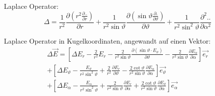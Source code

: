 \begin{description}
\[          \]
    \item Laplace Operator:
          \[
              \Delta=\frac{1}{r^{2}} \frac{\partial\left(r^{2} \frac{\partial . .}{\partial r}\right)}{\partial r}+\frac{1}{r^{2} \sin \vartheta} \frac{\partial\left(\sin \vartheta \frac{\partial . \ddot{ }}{\partial \vartheta}\right)}{\partial \vartheta}+\frac{1}{r^{2} \sin ^{2} \vartheta} \frac{\partial^{2} . .}{\partial \alpha^{2}}
          \]
    \item Laplace Operator in Kugelkoordinaten, angewandt auf einen Vektor:
          \begin{multline*}
              \Delta \vec{E}  =\left[\Delta E_{r}-\frac{2}{r^{2}} E_{r}-\frac{2}{r^{2} \sin \vartheta} \frac{\partial\left(\sin \vartheta \cdot E_{\vartheta}\right)}{\partial \vartheta}-\frac{2}{r^{2} \sin \vartheta} \frac{\partial E_{\alpha}}{\partial \alpha}\right] \vec{e_{r}}        \\
              +\left[\Delta E_{\vartheta}-\frac{E_{\vartheta}}{r^{2} \sin ^{2} \vartheta}+\frac{2}{r^{2}} \frac{\partial E_{r}}{\partial \vartheta}-\frac{2 \cot \vartheta}{r^{2} \sin \vartheta} \frac{\partial E_{\alpha}}{\partial \alpha}\right] \vec{e_{\vartheta}}       \\
              +\left[\Delta E_{\alpha}-\frac{E_{\alpha}}{r^{2} \sin ^{2} \vartheta}+\frac{2}{r^{2} \sin \vartheta} \frac{\partial E_{r}}{\partial \alpha}+\frac{2 \cot \vartheta}{r^{2} \sin \vartheta} \frac{\partial E_{\vartheta}}{\partial \alpha}\right] \vec{e_{\alpha}}
          \end{multline*}
\end{description}
